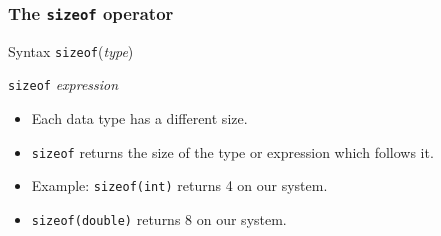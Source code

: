 \documentclass[handout]{beamer}
\begin{document}
\begin{frame}
    \frametitle{The {\tt sizeof} operator}
    \begin{block}{Syntax}
        {\tt sizeof}({\em type})\par
        {\tt sizeof} {\em expression}
    \end{block}
    \begin{itemize}
        \item Each data type has a different size.
        \item {\tt sizeof} returns the size of the type or expression 
            which follows it.
        \item Example: {\tt sizeof(int)} returns 4 on our system.
        \item {\tt sizeof(double)} returns 8 on our system.
    \end{itemize}
\end{frame}
\end{document}
